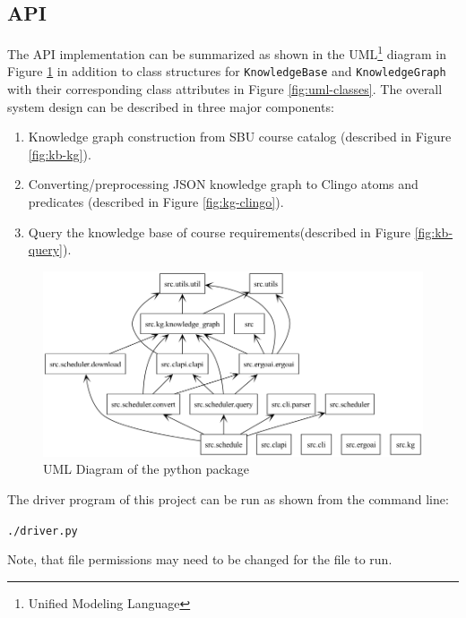 \documentclass[12pt]{article}
\begin{document}
    \subsection{API}
    \label{subsec:api}

    
    The API implementation can be summarized as shown in the UML\footnote{Unified Modeling Language} diagram in Figure \ref{fig:uml-package} in addition to class structures for {\tt{KnowledgeBase}} and {\tt{KnowledgeGraph}} with their corresponding class attributes in Figure \ref{fig:uml-classes}. The overall system design can be described in three major components: 

    \begin{enumerate}
        \item Knowledge graph construction from SBU course catalog (described in Figure \ref{fig:kb-kg}).
        \item Converting/preprocessing JSON knowledge graph to Clingo atoms and predicates (described in Figure \ref{fig:kg-clingo}).
        \item Query the knowledge base of course requirements(described in Figure \ref{fig:kb-query}).
    \end{enumerate}


    \begin{figure}[h!]
        \centering
        \includegraphics[scale=0.65]{figures/uml/packages_src.png}
        \caption{UML Diagram of the python package}
        \label{fig:uml-package}
    \end{figure}

    The driver program of this project can be run as shown from the command line:

    {\tt{./driver.py}}

    Note, that file permissions may need to be changed for the file to run.
\end{document}
